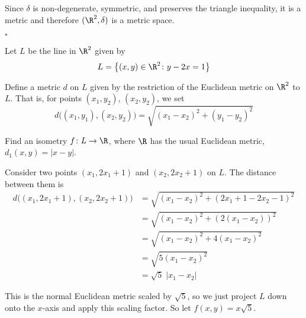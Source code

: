 \documentclass[a4paper]{article}
\begin{document}
Since $\delta$ is non-degenerate, symmetric, and preserves the triangle inequality, it is a metric and therefore $(\R^2, \delta)$ is a metric space.

\hfill $\square$



\begin{questionbody}
Let $L$ be the line in $\R^2$ given by \[
L = \big\{ (x, y) \in \R^2 \colon y - 2x = 1 \big\}
\]

Define a metric $d$ on $L$ given by the restriction of the Euclidean metric on $\R^2$ to $L$. That is, for points $(x_1, y_2)$, $(x_2, y_2)$, we set \[
d\big( (x_1, y_1), (x_2, y_2) \big) = \sqrt{{(x_1 - x_2)}^2 + {(y_1 - y_2)}^2}
\]

Find an isometry $f \colon L \to \R$, where $\R$ has the usual Euclidean metric, $d_1(x, y) = |x - y|$.
\end{questionbody}

\begin{center}
\end{center}


Consider two points $(x_1, 2 x_1 + 1)$ and $(x_2, 2 x_2 + 1)$ on $L$. The distance between them is \begin{align*}
d\big( (x_1, 2 x_1 + 1), (x_2, 2 x_2 + 1) \big) &= \sqrt{{(x_1 - x_2)}^2 + {(2 x_1 + 1 - 2 x_2 - 1)}^2} \\
&= \sqrt{{(x_1 - x_2)}^2 + {(2 (x_1 - x_2))}^2} \\
&= \sqrt{{(x_1 - x_2)}^2 + 4 {(x_1 - x_2)}^2} \\
&= \sqrt{5 {(x_1 - x_2)}^2} \\
&= \sqrt5\; |x_1 - x_2|
\end{align*}

This is the normal Euclidean metric scaled by $\sqrt5$, so we just project $L$ down onto the $x$-axis and apply this scaling factor. So let $f(x, y) = x \sqrt5$.

\end{document}
